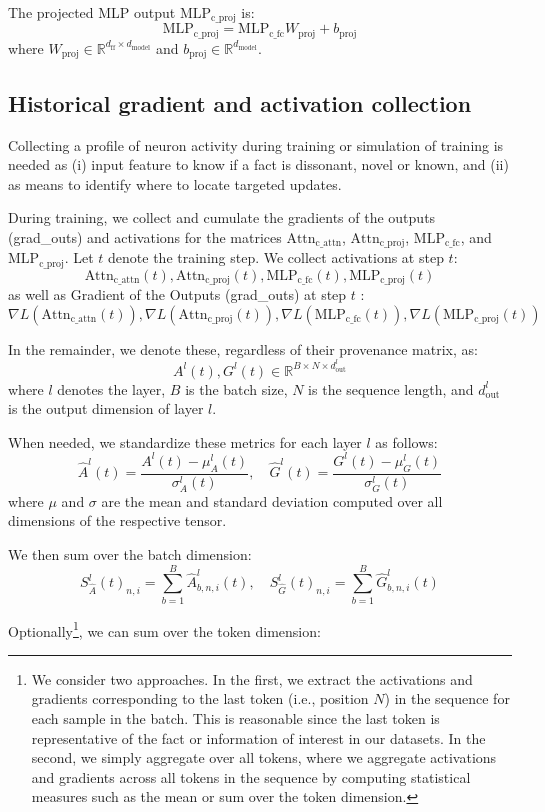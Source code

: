 The projected MLP output \(\text{MLP}_{\text{c\_proj}}\) is:
\[
\text{MLP}_{\text{c\_proj}} = \text{MLP}_{\text{c\_fc}} W_{\text{proj}} + b_{\text{proj}}
\]
where \( W_{\text{proj}} \in \mathbb{R}^{d_{\text{ff}} \times d_{\text{model}}} \) and \( b_{\text{proj}} \in \mathbb{R}^{d_{\text{model}}} \).

\subsection{Historical gradient and activation collection}
Collecting a profile of neuron activity during training or simulation of training is needed as (i) input feature to know if a fact is dissonant, novel or known, and (ii) as means to identify where to locate targeted updates.

During training, we collect and cumulate the gradients of the outputs (grad\_outs) and activations for the matrices \(\text{Attn}_{\text{c\_attn}}\), \(\text{Attn}_{\text{c\_proj}}\), \(\text{MLP}_{\text{c\_fc}}\), and \(\text{MLP}_{\text{c\_proj}}\).
Let \( t \) denote the training step.
We collect activations at step $t$:
\[\text{Attn}_{\text{c\_attn}}(t), \text{Attn}_{\text{c\_proj}}(t), \text{MLP}_{\text{c\_fc}}(t), \text{MLP}_{\text{c\_proj}}(t)\]
\noindent as well as 
Gradient of the Outputs (grad\_outs) at step $t$ : \[  \nabla L(\text{Attn}_{\text{c\_attn}}(t)), \nabla L(\text{Attn}_{\text{c\_proj}}(t)), \nabla L(\text{MLP}_{\text{c\_fc}}(t)), \nabla L(\text{MLP}_{\text{c\_proj}}(t))
    \]

In the remainder, we denote these, regardless of their provenance matrix, as:
\[A^l(t), G^l(t) \in \mathbb{R}^{B \times N \times d^l_{\text{out}}}\]
where \(l\) denotes the layer, \(B\) is the batch size, \(N\) is the sequence length, and \(d^l_{\text{out}}\) is the output dimension of layer \(l\).

When needed, we standardize these metrics for each layer \( l \) as follows:
\[
\hat{A}^l(t) = \frac{A^l(t) - \mu_A^l(t)}{\sigma_A^l(t)}, \quad \hat{G}^l(t) = \frac{G^l(t) - \mu_G^l(t)}{\sigma_G^l(t)}
\]
where \( \mu \) and \( \sigma \) are the mean and standard deviation computed over all dimensions of the respective tensor.

We then sum over the batch dimension:
\[
S^l_{\hat{A}}(t)_{n,i} = \sum_{b=1}^{B} \hat{A}^l_{b,n,i}(t), \quad S^l_{\hat{G}}(t)_{n,i} = \sum_{b=1}^{B} \hat{G}^l_{b,n,i}(t)
\]


Optionally\footnote{We consider two approaches. In the first, we extract the activations and gradients corresponding to the last token (i.e., position \( N \)) in the sequence for each sample in the batch. This is reasonable since the last token is representative of the fact or information of interest in our datasets. In the second, we simply aggregate over all tokens, where we aggregate activations and gradients across all tokens in the sequence by computing statistical measures such as the mean or sum over the token dimension.}, we can sum over the token dimension:

